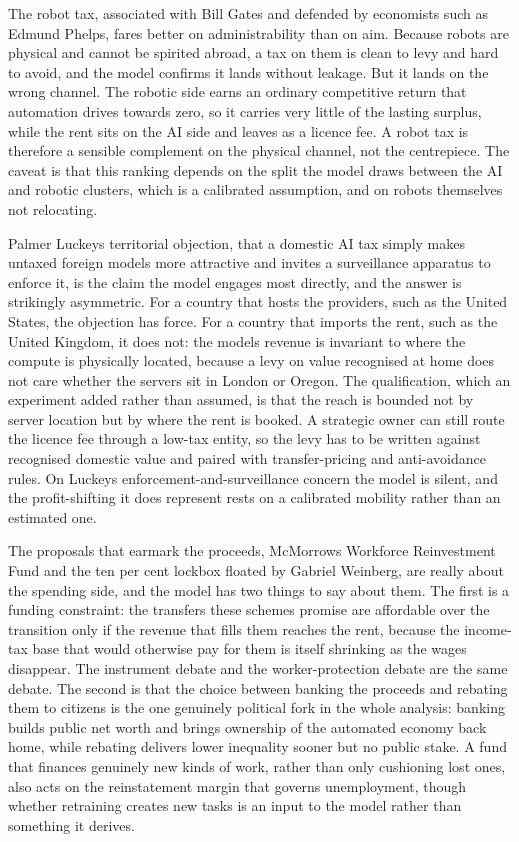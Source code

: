 \documentclass[12pt]{article}
\begin{document}
The robot tax, associated with Bill Gates and defended by economists
such as Edmund Phelps, fares better on administrability than on aim.
Because robots are physical and cannot be spirited abroad, a tax on them
is clean to levy and hard to avoid, and the model confirms it lands
without leakage. But it lands on the wrong channel. The robotic side
earns an ordinary competitive return that automation drives towards
zero, so it carries very little of the lasting surplus, while the rent
sits on the AI side and leaves as a licence fee. A robot tax is
therefore a sensible complement on the physical channel, not the
centrepiece. The caveat is that this ranking depends on the split the
model draws between the AI and robotic clusters, which is a calibrated
assumption, and on robots themselves not relocating.

Palmer Luckey\textquotesingle s territorial objection, that a domestic
AI tax simply makes untaxed foreign models more attractive and invites a
surveillance apparatus to enforce it, is the claim the model engages
most directly, and the answer is strikingly asymmetric. For a country
that hosts the providers, such as the United States, the objection has
force. For a country that imports the rent, such as the United Kingdom,
it does not: the model\textquotesingle s revenue is invariant to where
the compute is physically located, because a levy on value recognised at
home does not care whether the servers sit in London or Oregon. The
qualification, which an experiment added rather than assumed, is that
the reach is bounded not by server location but by where the rent is
booked. A strategic owner can still route the licence fee through a
low-tax entity, so the levy has to be written against recognised
domestic value and paired with transfer-pricing and anti-avoidance
rules. On Luckey\textquotesingle s enforcement-and-surveillance concern
the model is silent, and the profit-shifting it does represent rests on
a calibrated mobility rather than an estimated one.

The proposals that earmark the proceeds, McMorrow\textquotesingle s
Workforce Reinvestment Fund and the ten per cent lockbox floated by
Gabriel Weinberg, are really about the spending side, and the model has
two things to say about them. The first is a funding constraint: the
transfers these schemes promise are affordable over the transition only
if the revenue that fills them reaches the rent, because the income-tax
base that would otherwise pay for them is itself shrinking as the wages
disappear. The instrument debate and the worker-protection debate are
the same debate. The second is that the choice between banking the
proceeds and rebating them to citizens is the one genuinely political
fork in the whole analysis: banking builds public net worth and brings
ownership of the automated economy back home, while rebating delivers
lower inequality sooner but no public stake. A fund that finances
genuinely new kinds of work, rather than only cushioning lost ones, also
acts on the reinstatement margin that governs unemployment, though
whether retraining creates new tasks is an input to the model rather
than something it derives.
\end{document}

